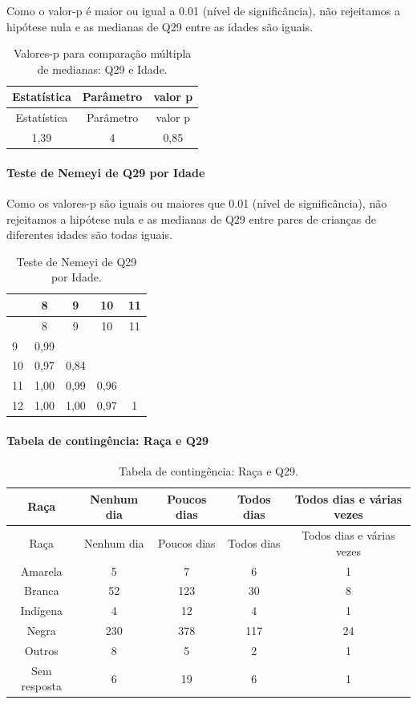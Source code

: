 \documentclass[]{article}
\let\oldparagraph\paragraph
\renewcommand{\paragraph}[1]{\oldparagraph{#1}\mbox{}}
\begin{document}
Como o valor-p é maior ou igual a 0.01 (nível de significância), não rejeitamos a hipótese nula e as medianas de Q29 entre as idades são iguais.

\begin{longtable}[]{@{}ccc@{}}
\caption{\label{tab:unnamed-chunk-925}Valores-p para comparação múltipla de medianas: Q29 e Idade.}\tabularnewline
\toprule
Estatística & Parâmetro & valor p\tabularnewline
\midrule
\endfirsthead
\toprule
Estatística & Parâmetro & valor p\tabularnewline
\midrule
\endhead
1,39 & 4 & 0,85\tabularnewline
\bottomrule
\end{longtable}

\hypertarget{teste-de-nemeyi-de-q29-por-idade}{%
\paragraph{Teste de Nemeyi de Q29 por Idade}\label{teste-de-nemeyi-de-q29-por-idade}}

Como os valores-p são iguais ou maiores que 0.01 (nível de significância), não rejeitamos a hipótese nula e as medianas de Q29 entre pares de crianças de diferentes idades são todas iguais.

\begin{longtable}[]{@{}lcccc@{}}
\caption{\label{tab:unnamed-chunk-927}Teste de Nemeyi de Q29 por Idade.}\tabularnewline
\toprule
& 8 & 9 & 10 & 11\tabularnewline
\midrule
\endfirsthead
\toprule
& 8 & 9 & 10 & 11\tabularnewline
\midrule
\endhead
9 & 0,99 & & &\tabularnewline
10 & 0,97 & 0,84 & &\tabularnewline
11 & 1,00 & 0,99 & 0,96 &\tabularnewline
12 & 1,00 & 1,00 & 0,97 & 1\tabularnewline
\bottomrule
\end{longtable}

\cleardoublepage

\hypertarget{tabela-de-continguxeancia-rauxe7a-e-q29}{%
\paragraph{Tabela de contingência: Raça e Q29}\label{tabela-de-continguxeancia-rauxe7a-e-q29}}

\begin{longtable}[]{@{}ccccc@{}}
\caption{\label{tab:unnamed-chunk-928}Tabela de contingência: Raça e Q29.}\tabularnewline
\toprule
Raça & Nenhum dia & Poucos dias & Todos dias & Todos dias e várias vezes\tabularnewline
\midrule
\endfirsthead
\toprule
Raça & Nenhum dia & Poucos dias & Todos dias & Todos dias e várias vezes\tabularnewline
\midrule
\endhead
Amarela & 5 & 7 & 6 & 1\tabularnewline
Branca & 52 & 123 & 30 & 8\tabularnewline
Indígena & 4 & 12 & 4 & 1\tabularnewline
Negra & 230 & 378 & 117 & 24\tabularnewline
Outros & 8 & 5 & 2 & 1\tabularnewline
Sem resposta & 6 & 19 & 6 & 1\tabularnewline
\bottomrule
\end{longtable}
\end{document}
